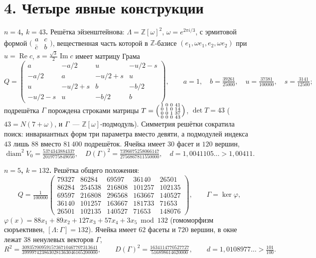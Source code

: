 \documentclass{article}
\theoremstyle{plain}
\theoremstyle{remark}
\newcommand{\Z}{\mathbb{Z}}
\newcommand{\diam}{\operatorname{diam}}
\begin{document}
\section*{4. Четыре явные конструкции}

{\bfseries\boldmath $n=4$, $k=43$.} Решётка эйзенштейнова: $\Lambda=\Z[\omega]^2$,
$\omega=e^{2\pi i/3}$, с эрмитовой формой
$\bigl(\begin{smallmatrix}a&c\\\bar c&b\end{smallmatrix}\bigr)$, вещественная
часть которой в $\Z$-базисе $(e_1,\omega e_1,e_2,\omega e_2)$ при
$u=\operatorname{Re}c$, $s=\tfrac{\sqrt3}2\operatorname{Im}c$ имеет матрицу
Грама
\[
Q=\left(\begin{smallmatrix}
a & -a/2 & u & -u/2-s\\
-a/2 & a & -u/2+s & u\\
u & -u/2+s & b & -b/2\\
-u/2-s & u & -b/2 & b
\end{smallmatrix}\right),\qquad
a=1,\quad b=\tfrac{39261}{25000},\quad u=\tfrac{37381}{100000},\quad s=\tfrac{3141}{12500};
\]
подрешётка $\Gamma$ порождена строками матрицы
$T=\Bigl(\begin{smallmatrix}1&0&0&41\\0&1&0&14\\0&0&1&37\\0&0&0&43\end{smallmatrix}\Bigr)$,
$\det T=43$ ($43=N(7+\omega)$, и $\Gamma$~--- $\Z[\omega]$-подмодуль).
Симметрия решётки сократила поиск: инвариантных форм три параметра вместо
девяти, а подмодулей индекса $43$ лишь $88$ вместо $81\,400$ подрешёток.
Ячейка имеет $30$ фасет и $120$ вершин,
\[
\diam^2V_0=\tfrac{5374343884337}{2019775849050},\quad
D(\Gamma)^2=\tfrac{7396075258066147}{2756867811550000},\quad
d=1{,}0041105\ldots>1{,}00411 .
\]

{\bfseries\boldmath $n=5$, $k=132$.} Решётка общего положения:
\[
Q=\tfrac1{100000}\left(\begin{smallmatrix}
79327&86284&69597&36140&26501\\
86284&254538&216808&101257&102135\\
69597&216808&296568&163667&140527\\
36140&101257&163667&181733&71653\\
26501&102135&140527&71653&148076
\end{smallmatrix}\right),
\qquad
\Gamma=\ker\varphi,
\]
$\varphi(x)=88x_1+89x_2+127x_3+57x_4+3x_5 \bmod 132$ (гомоморфизм
сюръективен, $[\Lambda:\Gamma]=132$). Ячейка имеет $62$ фасеты и $720$
вершин, в окне лежат $38$ ненулевых векторов $\Gamma$,
{\small
\[
R^2=\tfrac{3093570095915736710467707313641}{3999974238630281363046165200000},\qquad
D(\Gamma)^2=\tfrac{1634114770527727}{516898614620000},\qquad
d=1{,}0108977\ldots>\tfrac{101}{100}.
\]}
\end{document}
